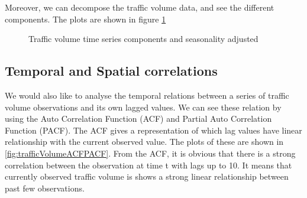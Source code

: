 Moreover, we can decompose the traffic volume data, and see the different components. The plots are
shown in figure \ref{fig:trafficVolumeComponents}

\begin{figure}[h]
    \centering
    \qquad
    \caption[Traffic volume time series]{Traffic volume time series components and seasonality adjusted}
   \label{fig:trafficVolumeComponents}
\end{figure}



\subsection{Temporal and Spatial correlations}
We would also like to analyse the temporal relations between a series of traffic volume observations and
its own lagged values. We can see these relation by using the Auto Correlation Function (ACF) and Partial Auto
Correlation Function (PACF). The ACF gives a representation of which lag values have linear relationship
with the current observed value. The plots of these are shown in \ref{fig:trafficVolumeACFPACF}. From the
ACF, it is obvious that there is a strong correlation between the observation at time t with lags
up to 10. It means that currently observed traffic volume is shows a strong linear relationship between
past few observations.

